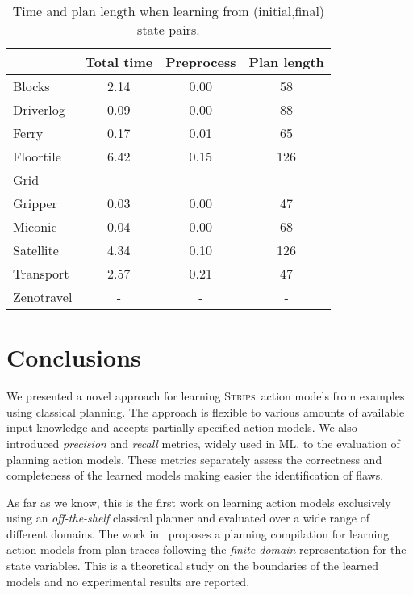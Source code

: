 \documentclass[letterpaper]{article} %
\newcommand{\strips}{\textsc{Strips}}     %
\begin{document}
\begin{table}
\begin{footnotesize}
	\begin{center}
		\begin{tabular}{l|c|c|c|}			
			 & Total time & Preprocess & Plan length  \\
			\hline
            Blocks & 2.14 & 0.00 & 58  \\
            Driverlog & 0.09 & 0.00 & 88 \\
            Ferry & 0.17 & 0.01 & 65 \\
            Floortile & 6.42 & 0.15 & 126 \\
            Grid & - & - & - \\
            Gripper & 0.03 & 0.00 & 47 \\
            Miconic & 0.04 & 0.00 & 68 \\
            Satellite & 4.34 & 0.10 & 126 \\
            Transport & 2.57 & 0.21 & 47 \\			
            Zenotravel & - & - & - \\
		\end{tabular}
	\end{center}
        \end{footnotesize}
	\caption{\small Time and plan length when learning from (initial,final) state pairs.}
	\label{tab:time_states}	
\end{table}

\section{Conclusions}
We presented a novel approach for learning \strips\ action models from examples using classical planning. The approach is flexible to various amounts of available input knowledge and accepts partially specified action models. We also introduced {\em precision} and {\em recall} metrics, widely used in ML, to the evaluation of planning action models. These metrics separately assess the correctness and completeness of the learned models making easier the identification of flaws.

As far as we know, this is the first work on learning action models exclusively using an {\em off-the-shelf} classical planner and evaluated over a wide range of different domains. The work in~\cite{SternJ17} proposes a planning compilation for learning action models from plan traces following the {\em finite domain} representation for the state variables. This is a theoretical study on the boundaries of the learned models and no experimental results are reported.
\end{document}
